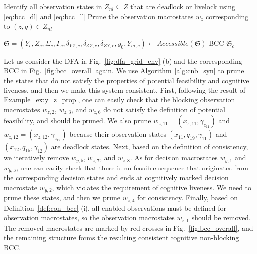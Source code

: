 \documentclass[final,5p,times,twocolumn,authoryear]{elsarticle}
\begin{document}
\begin{algorithm}[t!]
\caption{Synthesis of Cognitive Non-Blocking BCC}
\label{alg:cnb_syn}

\BlankLine

Identify all observation states in $Z_{nl} \subseteq Z$ that are deadlock or livelock using \eqref{eq:bcc_dl} and \eqref{eq:bcc_ll}\;
Prune the observation macrostates $w_z$ corresponding to $(z, q) \in Z_{nl}$\;


$
\mathfrak{S} = (Y_c, Z_c, \Sigma_c, \Gamma_c, \delta_{YZ,c}, \delta_{ZZ,c}, \delta_{ZY,c}, y_0, Y_{m,c}) \gets Accessible(\mathfrak{S})
$\;
\Return BCC $\mathfrak{S}_c$\;
\end{algorithm}

\begin{example}\label{ex:cnb_removal}
    Let us consider the DFA in Fig.~\ref{fig:dfa_grid_env} (b) and the corresponding BCC in Fig.~\ref{fig:bcc_overall} again.
    We use Algorithm~\ref{alg:cnb_syn} to prune the states that do not satisfy the properties of potential feasibility and cognitive liveness, and then we make this system consistent.
    First, following the result of Example~\ref{ex:y_z_prop}, one can easily check that the blocking observation macrostates $w_{z,2}$, $w_{z,3}$, and $w_{z,6}$ do not satisfy the definition of potential feasibility, and should be pruned.
    We also prune $w_{z,11} = (x_{z,11}, \gamma_{z_11})$ and $w_{z,12} = (x_{z,12}, \gamma_{z_12})$ because their observation states $(x_{11}, q_{19}, \gamma_{11})$ and $(x_{12}, q_{15}, \gamma_{12})$ are deadlock states.
    Next, based on the definition of consistency, we iteratively remove $w_{y,5}$, $w_{z,7}$, and $w_{z,8}$.
    As for decision macrostates $w_{y,1}$ and $w_{y,3}$, one can easily check that there is no feasible sequence that originates from the corresponding decision states and ends at cognitively marked decision macrostate $w_{y,2}$, which violates the requirement of cognitive liveness.
    We need to prune these states, and then we prune $w_{z,4}$ for consistency.
    Finally, based on Definition~\ref{def:con_bcc} (i), all enabled observations must be defined for observation macrostates, so the observation macrostates $w_{z,1}$ should be removed.
    The removed macrostates are marked by red crosses in Fig.~\ref{fig:bcc_overall}, and the remaining structure forms the resulting consistent cognitive non-blocking BCC.
\end{example}
\end{document}
